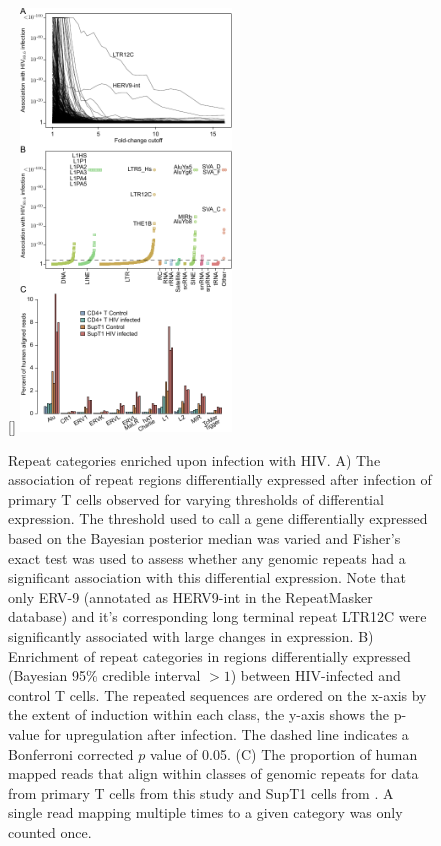 \documentclass[../sherrill-Mix_thesis.tex]{subfiles}
\begin{document}
		\begin{figure}
			\centering
				[\FBwidth]{
					\includegraphics[width=0.5\textwidth]{ltrCombo.pdf}
				}{
					\caption[Repeat categories enriched upon infection with HIV]{Repeat categories enriched upon infection with HIV. A) The association of repeat regions differentially expressed after \hivEight{} infection of primary T cells observed for varying thresholds of differential expression. The threshold used to call a gene differentially expressed based on the Bayesian posterior median was varied and Fisher's exact test was used to assess whether any genomic repeats had a significant association with this differential expression. Note that only ERV-9 (annotated as HERV9-int in the RepeatMasker database) and it's corresponding long terminal repeat LTR12C were significantly associated with large changes in expression. B) Enrichment of repeat categories in regions differentially expressed (Bayesian 95\% credible interval $>1$) between HIV-infected and control \cdFour{} T cells. The repeated sequences are ordered on the x-axis by the extent of induction within each class, the y-axis shows the p-value for upregulation after infection. The dashed line indicates a Bonferroni corrected $p$ value of 0.05. (C) The proportion of human mapped reads that align within classes of genomic repeats for data from primary \cdFour{} T cells from this study and SupT1 cells from \citet{Chang2011}. A single read mapping multiple times to a given category was only counted once.}
					\label{figHervs}
				}
		\end{figure}
\end{document}
